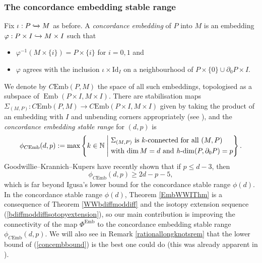 \documentclass[a4paper, oneside]{amsart}
\newcommand{\emb}{\operatorname{Emb}}
\newcommand{\cemb}{C\mathrm{Emb}}
\newcommand{\1}{\mathds{1}}
\theoremstyle{remark}
\theoremstyle{definition}
\newcommand{\N}{\mathbb{N}}
\numberwithin{equation}{section}
\begin{document}
\subsubsection{The concordance embedding stable range}\label{concembsection}
Fix $\iota: P\xhookrightarrow{} M$ as before. A \textit{concordance embedding} of $P$ into $M$ is an embedding $\varphi: P\times I\xhookrightarrow{}M\times I$ such that
    \begin{itemize}[itemsep=2pt, leftmargin=+.4in]
        \item[($a$)] $\varphi^{-1}(M\times\{i\})=P\times\{i\}$ for $i=0,1$ and
        \item[($b$)] $\varphi$ agrees with the inclusion $\iota\times \mathrm{Id}_I$ on a neighbourhood of $P\times \{0\}\cup \partial_0 P\times I$.
    \end{itemize}\vspace{1pt}
    We denote by $\cemb(P,M)$ the space of all such embeddings, topologised as a subspace of $\emb(P\times I, M\times I)$. There are stabilisation maps $\Sigma_{(M,P)}: \cemb(P,M)\to \cemb(P\times I, M\times I)$ given by taking the product of an embedding with $I$ and unbending corners  appropriately (see \cite[Fig. 1]{ConcEmbStablerange}), and the \textit{concordance embedding stable range} for $(d,p)$ is
    \begin{equation}\label{concembstablerange}
    \phi_{\cemb}(d,p):=\max\left\{k\in \N \;\middle|\;
    \begin{aligned}
        &\Sigma_{(M,P)} \ \text{is $k$-connected for all $(M,P)$}\\
        &\text{with $\dim M=d$ and \textit{h}-$\dim(P,\partial_0P)=p$}
    \end{aligned}\right\}.
    \end{equation}
    Goodwillie--Krannich--Kupers \cite{ConcEmbStablerange} have recently shown that if $p\leq d-3$, then 
    \begin{equation}\label{concembbound}
    \phi_{\cemb}(d,p)\geq 2d-p-5,\end{equation}
    which is far beyond Igusa's lower bound for the concordance stable range $\phi(d)$. In the concordance stable range $\phi(d)$, Theorem \ref{EmbWWIThm} is a consequence of Theorem \ref{WWbdiffmoddiff} and the isotopy extension sequence (\ref{bdiffmoddiffisotopyextension}), so our main contribution is improving the connectivity of the map $\Phi^{\emb}$ to the concordance embedding stable range $\phi_{\cemb}(d,p)$. We will also see in Remark \ref{rationallongknotsrem} that the lower bound of (\ref{concembbound}) is the best one could do (this was already apparent in \cite{ConcEmbStablerange}).
\end{document}
